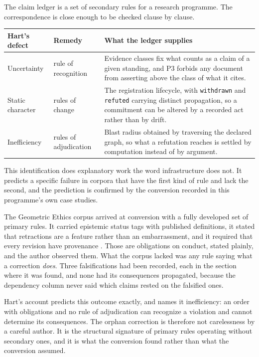 \documentclass[11pt,letterpaper]{article}
\begin{document}
The claim ledger is a set of secondary rules for a research programme. The
correspondence is close enough to be checked clause by clause.

\begin{center}
\begin{tabular}{p{} p{} p{}}
\toprule
\textbf{Hart's defect} & \textbf{Remedy} & \textbf{What the ledger supplies} \\
\midrule
Uncertainty & rule of recognition & Evidence classes fix what counts as a claim of a given standing, and P3 forbids any document from asserting above the class of what it cites. \\
Static character & rules of change & The registration lifecycle, with \texttt{withdrawn} and \texttt{refuted} carrying distinct propagation, so a commitment can be altered by a recorded act rather than by drift. \\
Inefficiency & rules of adjudication & Blast radius obtained by traversing the declared graph, so what a refutation reaches is settled by computation instead of by argument. \\
\bottomrule
\end{tabular}
\end{center}

This identification does explanatory work the word infrastructure does not. It
predicts a specific failure in corpora that have the first kind of rule and lack
the second, and the prediction is confirmed by the conversion recorded in this
programme's own case studies.

The Geometric Ethics corpus arrived at conversion with a fully developed set of
primary rules. It carried epistemic status tags with published definitions, it
stated that retractions are a feature rather than an embarrassment, and it
required that every revision have provenance \citep{casebrownfield}. Those are
obligations on conduct, stated plainly, and the author observed them. What the
corpus lacked was any rule saying what a correction \emph{does}. Three
falsifications had been recorded, each in the section where it was found, and
none had its consequences propagated, because the dependency column never said
which claims rested on the falsified ones.

Hart's account predicts this outcome exactly, and names it inefficiency: an order
with obligations and no rule of adjudication can recognize a violation and cannot
determine its consequences. The orphan correction is therefore not carelessness
by a careful author. It is the structural signature of primary rules operating
without secondary ones, and it is what the conversion found rather than what the
conversion assumed.
\end{document}

